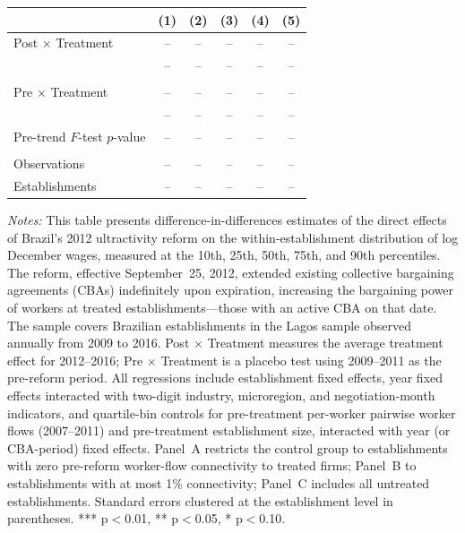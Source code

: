 \documentclass[12pt,letterpaper]{article}
\begin{document}
\begin{table}[]
\begin{threeparttable}
\begin{tabular}{lccccc}
 & (1) & (2) & (3) & (4) & (5) \\
\midrule
Post $\times$ Treatment & -- & -- & -- & -- & -- \\
  & -- & -- & -- & -- & -- \\
  &  &  &  &  & \\
Pre $\times$ Treatment & -- & -- & -- & -- & -- \\
  & -- & -- & -- & -- & -- \\
Pre-trend $F$-test $p$-value & -- & -- & -- & -- & -- \\
  &  &  &  &  & \\
Observations & -- & -- & -- & -- & -- \\
Establishments & -- & -- & -- & -- & -- \\
\bottomrule
\end{tabular}
\scriptsize
\begin{tablenotes}
\item \textit{Notes:} This table presents difference-in-differences estimates of the direct effects of Brazil's 2012 ultractivity reform on the within-establishment distribution of log December wages, measured at the 10th, 25th, 50th, 75th, and 90th percentiles. The reform, effective September~25, 2012, extended existing collective bargaining agreements (CBAs) indefinitely upon expiration, increasing the bargaining power of workers at treated establishments---those with an active CBA on that date. The sample covers Brazilian establishments in the Lagos sample observed annually from 2009 to 2016. Post $\times$ Treatment measures the average treatment effect for 2012--2016; Pre $\times$ Treatment is a placebo test using 2009--2011 as the pre-reform period. All regressions include establishment fixed effects, year fixed effects interacted with two-digit industry, microregion, and negotiation-month indicators, and quartile-bin controls for pre-treatment per-worker pairwise worker flows (2007--2011) and pre-treatment establishment size, interacted with year (or CBA-period) fixed effects. Panel~A restricts the control group to establishments with zero pre-reform worker-flow connectivity to treated firms; Panel~B to establishments with at most 1\% connectivity; Panel~C includes all untreated establishments. Standard errors clustered at the establishment level in parentheses. *** p$<$0.01, ** p$<$0.05, * p$<$0.10.
\end{tablenotes}
\end{threeparttable}
\end{table}
\end{document}
